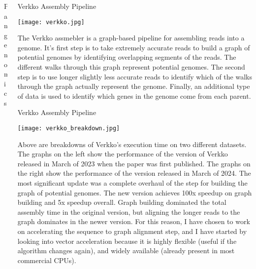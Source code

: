 \documentclass{cbxposter}
\renewcommand{\smallskip}{\vspace{0.16667in}}
\begin{document}
\begin{frame}[fragile,t]{}
\begin{columns}[T]
\begin{column}{10.5in}
\begin{block}{Pangenomics}
\end{block}

\end{column}


\begin{column}{10.5in}
\vspace{0.4in}


\begin{block}{Verkko Assembly Pipeline}
  \begin{center}
    \texttt{[image: verkko.jpg]}
  \end{center}
  \smallskip
  The Verkko assmebler is a graph-based pipeline for assembling reads
  into a genome. It's first step is to take extremely accurate reads to
  build a graph of potential genomes by identifying overlapping segments
  of the reads. The different walks through this graph represent potential
  genomes. The second step is to use longer slightly less accurate reads
  to identify which of the walks through the graph actually represent the
  genome. Finally, an additional type of data is used to identify which
  genes in the genome come from each parent.
\end{block}


\vspace{0.67in}
\begin{block}{Verkko Assembly Pipeline}
  \begin{center}
    \texttt{[image: verkko\_breakdown.jpg]}
  \end{center}
  \smallskip
  Above are breakdowns of Verkko's execution time on two different datasets.
  The graphs on the left show the performance of the version of Verkko
  released in March of 2023 when the paper was first published. The graphs
  on the right show the performance of the version released in March of 2024.
  The most significant update was a complete overhaul of the step for building
  the graph of potential genomes. The new version achieves 100x speedup on
  graph building and 5x speedup overall. Graph building dominated the total
  assembly time in the original version, but aligning the longer reads to the
  graph dominates in the newer version. For this reason, I have chosen to
  work on accelerating the sequence to graph alignment step, and I have
  started by looking into vector acceleration because it is highly flexible
  (useful if the algorithm changes again), and widely available (already
  present in most commercial CPUs).
\end{block}


\end{column}
\end{columns}
\end{frame}
\end{document}
